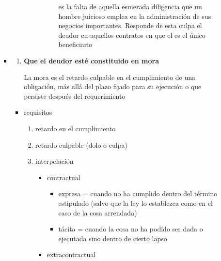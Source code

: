 \documentclass[]{article}
\providecommand{\tightlist}{%
  \setlength{\itemsep}{0pt}\setlength{\parskip}{0pt}}
\begin{document}
\begin{itemize}
\begin{itemize}
\begin{itemize}
\begin{itemize}
\begin{itemize}
\begin{itemize}
\begin{itemize}
              es la falta de aquella esmerada diligencia que un hombre
              juicioso emplea en la administración de sus negocios
              importantes. Responde de esta culpa el deudor en aquellos
              contratos en que el es el único beneficiario
            \end{itemize}
          \end{itemize}
        \end{itemize}
      \end{itemize}
    \item
      \begin{enumerate}
      \def\labelenumi{\alph{enumi})}
      \setcounter{enumi}{3}
      \item
        \textbf{Que el deudor esté constituido en mora}

        La mora es el retardo culpable en el cumplimiento de una
        obligación, más allá del plazo fijado para su ejecución o que
        persiste después del requerimiento
      \end{enumerate}

      \begin{itemize}
      \item
        requisitos

        \begin{enumerate}
        \def\labelenumi{\arabic{enumi}.}
        \tightlist
        \item
          retardo en el cumplimiento
        \item
          retardo culpable (dolo o culpa)
        \item
          interpelación

          \begin{itemize}
          \tightlist
          \item
            contractual

            \begin{itemize}
            \tightlist
            \item
              expresa = cuando no ha cumplido dentro del término
              estipulado (salvo que la ley lo establezca como en el caso
              de la cosa arrendada)
            \item
              tácita = cuando la cosa no ha podido ser dada o ejecutada
              sino dentro de cierto lapso
            \end{itemize}
          \item
            extracontractual


\end{itemize}
\end{enumerate}
\end{itemize}
\end{itemize}
\end{itemize}
\end{itemize}
\end{document}
